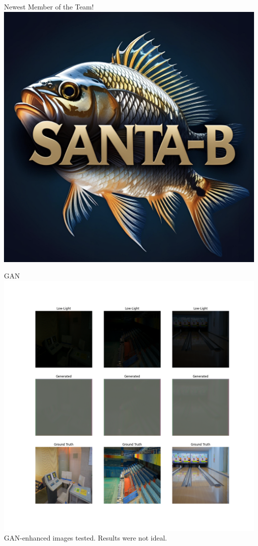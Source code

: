 \begin{frame}{Newest Member of the Team!}
    \centering
    \includegraphics[width=4.0\textwidth, height=0.8\textheight, keepaspectratio]{images/santa-b_graphic.png}
\end{frame}

\begin{frame}{GAN}
    \centering
    \includegraphics[width=1.0\textwidth, height=0.8\textheight, keepaspectratio]{images/plot_000001.png}
    \vspace{0.5em}
    GAN-enhanced images tested.
    Results were not ideal.
\end{frame}

